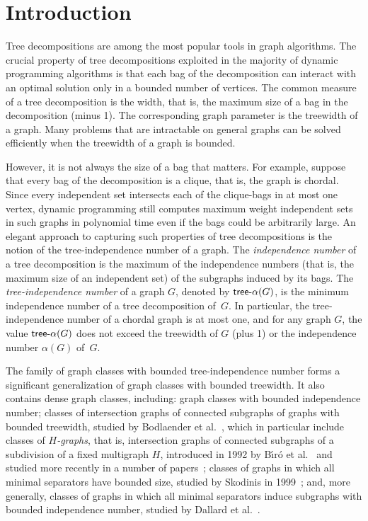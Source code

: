 \documentclass[11pt]{article}
\theoremstyle{definition}
\newcommand{\tin}{\mathsf{tree} \textnormal{-} \alpha}
\begin{document}
\section{Introduction}

Tree decompositions are among the most popular tools in graph algorithms.
The crucial property of tree decompositions exploited in the majority of dynamic programming algorithms is that each bag of the decomposition can interact with an optimal solution only in a bounded number of vertices. The common measure of a tree decomposition is the width, that is,  the maximum size of a bag in the decomposition (minus 1). The corresponding graph parameter is the treewidth of a graph.
Many problems that are intractable on general graphs can be solved efficiently when the treewidth of a graph is bounded.


However, it is not always the size of a bag that matters. For example, suppose that every bag of the decomposition is a clique, that is, the graph is chordal. Since every independent set intersects each of the clique-bags in at most one vertex, dynamic programming still computes maximum weight independent sets in such graphs in polynomial time even if the bags could be arbitrarily large.
An elegant approach to capturing such properties of tree decompositions 
is the notion of the tree-independence number of a graph.
The \emph{independence number} of a tree decomposition is the maximum of the independence numbers (that is, the maximum size of an independent set) of the subgraphs induced by its bags.
The \emph{tree-independence number} of a graph $G$, denoted by  $\tin(G)$,  is the minimum independence number of a tree decomposition of~$G$. In particular, the tree-independence number of a chordal graph is at most one, and for any graph $G$, the value $\tin(G)$ does not exceed the treewidth of $G$ (plus 1) or the independence number $\alpha(G)$ of~$G$.

The family of graph classes with bounded tree-independence number forms a significant generalization of graph classes with bounded treewidth.
It also contains dense graph classes, including: graph classes with bounded independence number;
classes of intersection graphs of connected subgraphs of graphs with bounded treewidth, studied by Bodlaender et al.~\cite{bodlaender1998}, which in particular include classes of \emph{{$H$}-graphs}, that is, intersection graphs of connected subgraphs of a subdivision of a fixed multigraph $H$, introduced in 1992 by B\'{\i}r\'{o} et al.~\cite{MR1172354} and studied more recently in a number of papers~\cite{MR4249058,MR4141534,MR4332111}; classes of graphs in which all minimal separators have bounded size, studied by Skodinis in 1999~\cite{Skodinis99}; and, more generally, classes of graphs in which all minimal separators induce subgraphs with bounded independence number, studied  by Dallard et al.~\cite{DallardMS24}.
\end{document}
